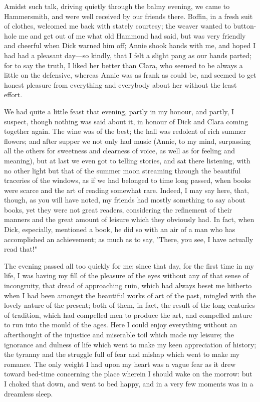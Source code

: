 Amidst such talk, driving quietly through the balmy evening, we came to
Hammersmith, and were well received by our friends there. Boffin, in a
fresh suit of clothes, welcomed me back with stately courtesy; the
weaver wanted to button-hole me and get out of me what old Hammond had
said, but was very friendly and cheerful when Dick warned him off; Annie
shook hands with me, and hoped I had had a pleasant day---so kindly,
that I felt a slight pang as our hands parted; for to say the truth, I
liked her better than Clara, who seemed to be always a little on the
defensive, whereas Annie was as frank as could be, and seemed to get
honest pleasure from everything and everybody about her without the
least effort.

We had quite a little feast that evening, partly in my honour, and
partly, I suspect, though nothing was said about it, in honour of Dick
and Clara coming together again. The wine was of the best; the hall was
redolent of rich summer flowers; and after supper we not only had music
(Annie, to my mind, surpassing all the others for sweetness and
clearness of voice, as well as for feeling and meaning), but at last we
even got to telling stories, and sat there listening, with no other
light but that of the summer moon streaming through the beautiful
traceries of the windows, as if we had belonged to time long passed,
when books were scarce and the art of reading somewhat rare. Indeed, I
may say here, that, though, as you will have noted, my friends had
mostly something to say about books, yet they were not great readers,
considering the refinement of their manners and the great amount of
leisure which they obviously had. In fact, when Dick, especially,
mentioned a book, he did so with an air of a man who has accomplished an
achievement; as much as to say, "There, you see, I have actually read
that!"

The evening passed all too quickly for me; since that day, for the first
time in my life, I was having my fill of the pleasure of the eyes
without any of that sense of incongruity, that dread of approaching
ruin, which had always beset me hitherto when I had been amongst the
beautiful works of art of the past, mingled with the lovely nature of
the present; both of them, in fact, the result of the long centuries of
tradition, which had compelled men to produce the art, and compelled
nature to run into the mould of the ages. Here I could enjoy everything
without an afterthought of the injustice and miserable toil which made
my leisure; the ignorance and dulness of life which went to make my keen
appreciation of history; the tyranny and the struggle full of fear and
mishap which went to make my romance. The only weight I had upon my
heart was a vague fear as it drew toward bed-time concerning the place
wherein I should wake on the morrow: but I choked that down, and went to
bed happy, and in a very few moments was in a dreamless sleep.
